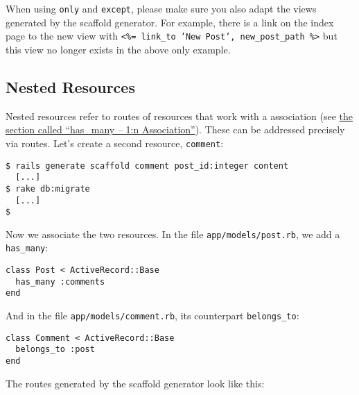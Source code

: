 \documentclass[a4paper]{book}
\begin{document}
When using \texttt{only} and \texttt{except}, please make sure you also adapt the views generated by the scaffold generator. For example, there is a link on the index page to the new view with \texttt{\textless{}\%= link\_to 'New Post', new\_post\_path \%\textgreater{}} but this view no longer exists in the above only example.

\subsection{Nested Resources}\label{nested-resources}

Nested resources refer to routes of resources that work with a association (see \hyperref[activerecordux5fhasux5fmany]{the section called “has\_many -- 1:n Association”}). These can be addressed precisely via routes. Let's create a second resource, \texttt{comment}:

\begin{shaded}\begin{verbatim}
$ rails generate scaffold comment post_id:integer content
  [...]
$ rake db:migrate
  [...]
$
\end{verbatim}\end{shaded}

Now we associate the two resources. In the file \texttt{app/models/post.rb}, we add a \texttt{has\_many}:

\begin{shaded}\begin{verbatim}
class Post < ActiveRecord::Base
  has_many :comments
end
\end{verbatim}\end{shaded}

And in the file \texttt{app/models/comment.rb}, its counterpart \texttt{belongs\_to}:

\begin{shaded}\begin{verbatim}
class Comment < ActiveRecord::Base
  belongs_to :post
end
\end{verbatim}\end{shaded}

The routes generated by the scaffold generator look like this:
\end{document}
